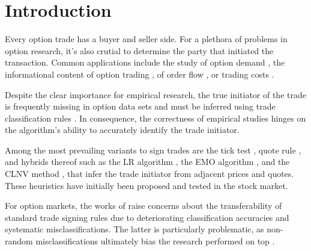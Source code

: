 \section{Introduction}\label{sec:introduction}

Every option trade has a buyer and seller side. For a plethora of problems in option research, it’s also crutial to determine the party that initiated the transaction. Common applications include the study of option demand \autocite[][3]{garleanuDemandBasedOptionPricing2009}, the informational content of option trading \autocites[][631]{huDoesOptionTrading2014}[][882]{panInformationOptionVolume2006}, of order flow \autocite[][684]{muravyevOrderFlowExpected2016}, or trading costs \autocite[][4980]{muravyevOptionsTradingCosts2020}. 

Despite the clear importance for empirical research, the true initiator of the trade is frequently missing in option data sets and must be inferred using trade classification rules \autocite[][453]{easleyOptionVolumeStock1998}. In consequence, the correctness of empirical studies hinges on the algorithm's ability to accurately identify the trade initiator.

Among the most prevailing variants to sign trades are the tick test \autocite[][240]{hasbrouckTradesQuotesInventories1988}, quote rule \autocite[][41]{harrisDayEndTransactionPrice1989}, and hybrids thereof such as the \gls{LR} algorithm \autocite[][745]{leeInferringTradeDirection1991}, the \gls{EMO} algorithm \autocite[][536]{ellisAccuracyTradeClassification2000}, and the \gls{CLNV} method \autocite[][3809]{chakrabartyTradeClassificationAlgorithms2007}, that infer the trade initiator from adjacent prices and quotes. These heuristics have initially been proposed and tested in the stock market.

For option markets, the works of \textcites[][10--13]{grauerOptionTradeClassification2022}[][887]{savickasInferringDirectionOption2003} raise concerns about the transferability of standard trade signing rules due to deteriorating classification accuracies and systematic misclassifications. The latter is particularly problematic, as non-random misclassifications ultimately bias the research performed on top \autocite[][260]{odders-whiteOccurrenceConsequencesInaccurate2000}.

